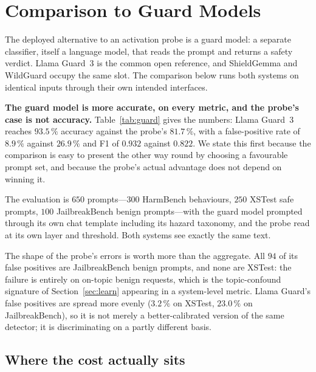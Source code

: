 \section{Comparison to Guard Models}
\label{sec:guard}

The deployed alternative to an activation probe is a guard model: a separate classifier, itself a language model,
that reads the prompt and returns a safety verdict. Llama Guard~3 \cite{inan2023llama} is the common open reference,
and ShieldGemma \cite{zeng2024shieldgemma} and WildGuard \cite{han2024wildguard} occupy the same slot. The comparison
below runs both systems on identical inputs through their own intended interfaces.

\textbf{The guard model is more accurate, on every metric, and the probe's case is not accuracy.}
Table~\ref{tab:guard} gives the numbers: Llama Guard~3 reaches $93.5\,\%$ accuracy against the probe's $81.7\,\%$,
with a false-positive rate of $8.9\,\%$ against $26.9\,\%$ and F1 of $0.932$ against $0.822$. We state this first
because the comparison is easy to present the other way round by choosing a favourable prompt set, and because the
probe's actual advantage does not depend on winning it.



The evaluation is $650$ prompts---$300$ HarmBench behaviours, $250$ XSTest safe prompts, $100$ JailbreakBench benign
prompts---with the guard model prompted through its own chat template including its hazard taxonomy, and the probe
read at its own layer and threshold. Both systems see exactly the same text.

The shape of the probe's errors is worth more than the aggregate. All $94$ of its false positives are JailbreakBench
benign prompts, and none are XSTest: the failure is entirely on on-topic benign requests, which is the topic-confound
signature of Section~\ref{sec:learn} appearing in a system-level metric. Llama Guard's false positives are spread
more evenly ($3.2\,\%$ on XSTest, $23.0\,\%$ on JailbreakBench), so it is not merely a better-calibrated version of
the same detector; it is discriminating on a partly different basis.

\subsection{Where the cost actually sits}
\label{sec:cost}

